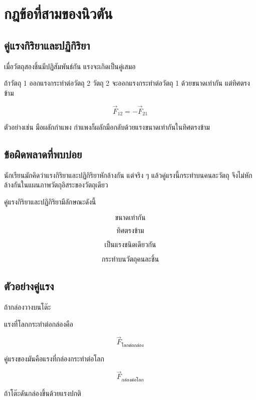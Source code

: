 \section{กฎข้อที่สามของนิวตัน}

\subsection{คู่แรงกิริยาและปฏิกิริยา}

เมื่อวัตถุสองชิ้นมีปฏิสัมพันธ์กัน แรงจะเกิดเป็นคู่เสมอ

\begin{tcolorbox}[title=กฎข้อที่สามของนิวตัน]
ถ้าวัตถุ 1 ออกแรงกระทำต่อวัตถุ 2 วัตถุ 2 จะออกแรงกระทำต่อวัตถุ 1 ด้วยขนาดเท่ากัน แต่ทิศตรงข้าม

\[
\vec{F}_{12}=-\vec{F}_{21}
\]
\end{tcolorbox}

ตัวอย่างเช่น มือผลักกำแพง กำแพงก็ผลักมือกลับด้วยแรงขนาดเท่ากันในทิศตรงข้าม

\subsection{ข้อผิดพลาดที่พบบ่อย}

นักเรียนมักคิดว่าแรงกิริยาและปฏิกิริยาหักล้างกัน แต่จริง ๆ แล้วคู่แรงนี้กระทำบนคนละวัตถุ จึงไม่หักล้างกันในแผนภาพวัตถุอิสระของวัตถุเดียว

\begin{tcolorbox}[title=ข้อควรจำ]
คู่แรงกิริยาและปฏิกิริยามีลักษณะดังนี้

\[
\text{ขนาดเท่ากัน}
\]

\[
\text{ทิศตรงข้าม}
\]

\[
\text{เป็นแรงชนิดเดียวกัน}
\]

\[
\text{กระทำบนวัตถุคนละชิ้น}
\]
\end{tcolorbox}

\subsection{ตัวอย่างคู่แรง}

ถ้ากล่องวางบนโต๊ะ

แรงที่โลกกระทำต่อกล่องคือ

\[
\vec{F}_{\text{โลกต่อกล่อง}}
\]

คู่แรงของมันคือแรงที่กล่องกระทำต่อโลก

\[
\vec{F}_{\text{กล่องต่อโลก}}
\]

ถ้าโต๊ะดันกล่องขึ้นด้วยแรงปกติ

